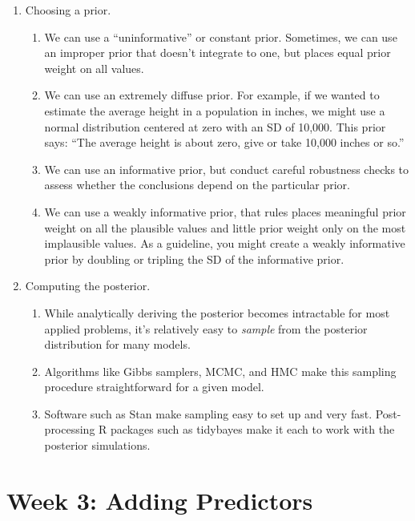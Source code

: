 \documentclass[
]{book}
\providecommand{\tightlist}{%
  \setlength{\itemsep}{0pt}\setlength{\parskip}{0pt}}
\begin{document}
\begin{enumerate}
\def\labelenumi{\arabic{enumi}.}
\tightlist
\item
  Choosing a prior.

  \begin{enumerate}
  \def\labelenumii{\alph{enumii}.}
  \tightlist
  \item
    We can use a ``uninformative'' or constant prior. Sometimes, we can
    use an improper prior that doesn't integrate to one, but places
    equal prior weight on all values.
  \item
    We can use an extremely diffuse prior. For example, if we wanted to
    estimate the average height in a population in inches, we might use
    a normal distribution centered at zero with an SD of 10,000. This
    prior says: ``The average height is about zero, give or take 10,000
    inches or so.''
  \item
    We can use an informative prior, but conduct careful robustness
    checks to assess whether the conclusions depend on the particular
    prior.
  \item
    We can use a weakly informative prior, that rules places meaningful
    prior weight on all the plausible values and little prior weight
    only on the most implausible values. As a guideline, you might
    create a weakly informative prior by doubling or tripling the SD of
    the informative prior.
  \end{enumerate}
\item
  Computing the posterior.

  \begin{enumerate}
  \def\labelenumii{\alph{enumii}.}
  \tightlist
  \item
    While analytically deriving the posterior becomes intractable for
    most applied problems, it's relatively easy to \emph{sample} from
    the posterior distribution for many models.
  \item
    Algorithms like Gibbs samplers, MCMC, and HMC make this sampling
    procedure straightforward for a given model.
  \item
    Software such as Stan make sampling easy to set up and very fast.
    Post-processing R packages such as tidybayes make it each to work
    with the posterior simulations.
  \end{enumerate}
\end{enumerate}

\hypertarget{week-3-adding-predictors}{%
\chapter{Week 3: Adding Predictors}\label{week-3-adding-predictors}}
\end{document}
